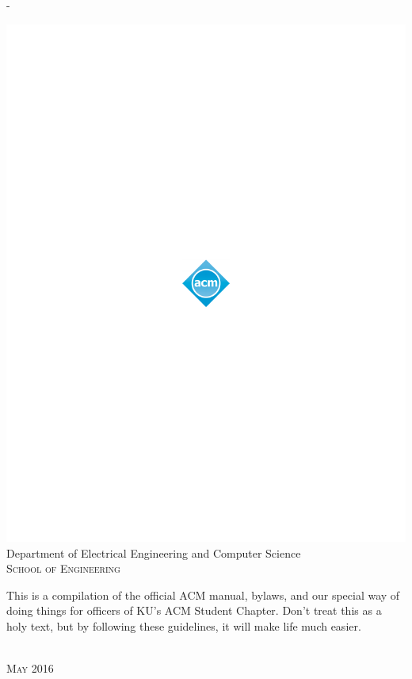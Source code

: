 \begin{titlingpage}
\begin{SingleSpace}
\begin{adjustwidth*}{\unitlength}{-\unitlength}
\begin{center}
\includegraphics[scale=1.8]{logos/acm_sym_1s_grad_pos}\\
\vspace{6mm}
{\large Department of Electrical Engineering and Computer Science\\
\textsc{School of Engineering}}\\
\vspace{11mm}
\begin{minipage}{10cm}
This is a compilation of the official ACM manual, bylaws, and our special way of doing things for officers of KU's ACM Student Chapter. Don't treat this as a holy text, but by following these guidelines, it will make life much easier.
\end{minipage}\\
\vspace{9mm}
{\large\textsc{May 2016}}
\vspace{12mm}
\end{center}
\end{adjustwidth*}
\end{SingleSpace}
\end{titlingpage}